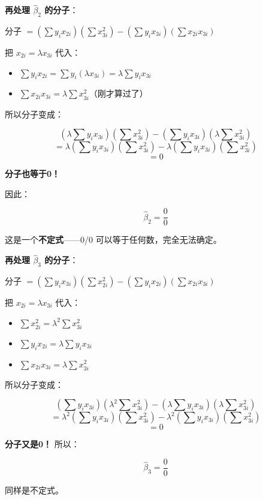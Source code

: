 \documentclass[12pt,a4paper]{ctexart}
\begin{document}
\textbf{再处理 $\hat{\beta}_2$ 的分子}：

分子 $= (\sum y_i x_{2i})(\sum x_{3i}^2) - (\sum y_i x_{3i})(\sum x_{2i} x_{3i})$

把 $x_{2i} = \lambda x_{3i}$ 代入：
\begin{itemize}
    \item $\sum y_i x_{2i} = \sum y_i (\lambda x_{3i}) = \lambda \sum y_i x_{3i}$
    \item $\sum x_{2i} x_{3i} = \lambda \sum x_{3i}^2$（刚才算过了）
\end{itemize}

所以分子变成：

\[
(\lambda \sum y_i x_{3i})(\sum x_{3i}^2) - (\sum y_i x_{3i})(\lambda \sum x_{3i}^2)
\]
\[
= \lambda (\sum y_i x_{3i})(\sum x_{3i}^2) - \lambda (\sum y_i x_{3i})(\sum x_{3i}^2)
\]
\[
= 0
\]

\textbf{分子也等于0！}

因此：

\begin{equation}
\hat{\beta}_2 = \frac{0}{0} \tag{4.7}
\end{equation}

这是一个\textbf{不定式}——0/0 可以等于任何数，完全无法确定。

\textbf{再处理 $\hat{\beta}_3$ 的分子}：

分子 $= (\sum y_i x_{3i})(\sum x_{2i}^2) - (\sum y_i x_{2i})(\sum x_{2i} x_{3i})$

把 $x_{2i} = \lambda x_{3i}$ 代入：
\begin{itemize}
    \item $\sum x_{2i}^2 = \lambda^2 \sum x_{3i}^2$
    \item $\sum y_i x_{2i} = \lambda \sum y_i x_{3i}$
    \item $\sum x_{2i} x_{3i} = \lambda \sum x_{3i}^2$
\end{itemize}

所以分子变成：

\[
(\sum y_i x_{3i})(\lambda^2 \sum x_{3i}^2) - (\lambda \sum y_i x_{3i})(\lambda \sum x_{3i}^2)
\]
\[
= \lambda^2 (\sum y_i x_{3i})(\sum x_{3i}^2) - \lambda^2 (\sum y_i x_{3i})(\sum x_{3i}^2)
\]
\[
= 0
\]

\textbf{分子又是0！} 所以：

\begin{equation}
\hat{\beta}_3 = \frac{0}{0} \tag{4.8}
\end{equation}

同样是不定式。
\end{document}
